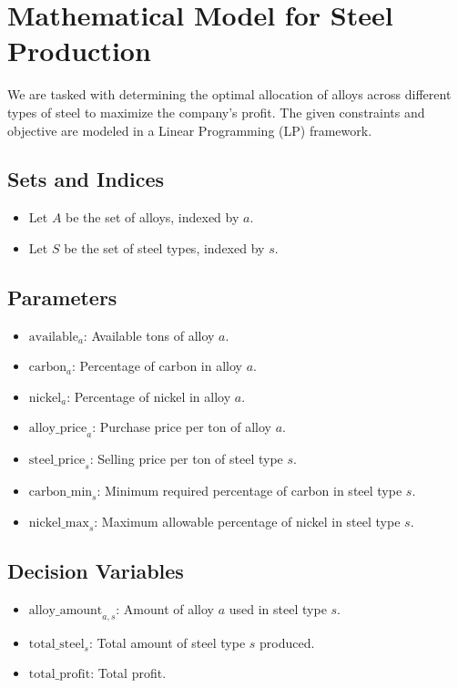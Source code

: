 \documentclass{article}
\begin{document}
\section*{Mathematical Model for Steel Production}

We are tasked with determining the optimal allocation of alloys across different types of steel to maximize the company's profit. The given constraints and objective are modeled in a Linear Programming (LP) framework.

\subsection*{Sets and Indices}
\begin{itemize}
    \item Let \( A \) be the set of alloys, indexed by \( a \).
    \item Let \( S \) be the set of steel types, indexed by \( s \).
\end{itemize}

\subsection*{Parameters}
\begin{itemize}
    \item \( \text{available}_a \): Available tons of alloy \( a \).
    \item \( \text{carbon}_a \): Percentage of carbon in alloy \( a \).
    \item \( \text{nickel}_a \): Percentage of nickel in alloy \( a \).
    \item \( \text{alloy\_price}_a \): Purchase price per ton of alloy \( a \).
    \item \( \text{steel\_price}_s \): Selling price per ton of steel type \( s \).
    \item \( \text{carbon\_min}_s \): Minimum required percentage of carbon in steel type \( s \).
    \item \( \text{nickel\_max}_s \): Maximum allowable percentage of nickel in steel type \( s \).
\end{itemize}

\subsection*{Decision Variables}
\begin{itemize}
    \item \( \text{alloy\_amount}_{a,s} \): Amount of alloy \( a \) used in steel type \( s \).
    \item \( \text{total\_steel}_s \): Total amount of steel type \( s \) produced.
    \item \( \text{total\_profit} \): Total profit.
\end{itemize}
\end{document}
